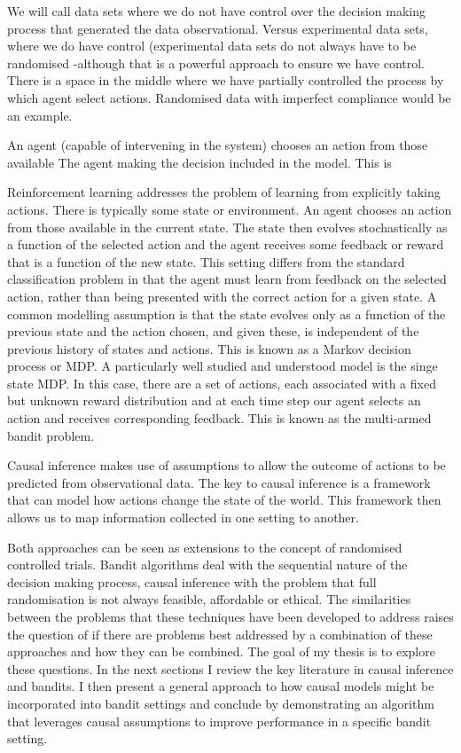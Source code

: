 \documentclass[11pt,a4paper,oneside]{book}
\theoremstyle{plain}
\theoremstyle{definition}
\begin{document}
We will call data sets where we do not have control over the decision making process that generated the data observational. Versus experimental data sets, where we do have control (experimental data sets do not always have to be randomised -although that is a powerful approach to ensure we have control. There is a space in the middle where we have partially controlled the process by which agent select actions. Randomised data with imperfect compliance would be an example.


An agent (capable of intervening in the system) chooses an action from those available The agent making the decision included in the model. This is

Reinforcement learning addresses the problem of learning from explicitly taking actions. There
is typically some state or environment. An agent chooses an action from those available in the
current state. The state then evolves stochastically as a function of the selected action and
the agent receives some feedback or reward that is a function of the new state. This setting
differs from the standard classification problem in that the agent must learn from feedback on
the selected action, rather than being presented with the correct action for a given state. A
common modelling assumption is that the state evolves only as a function of the previous state
and the action chosen, and given these, is independent of the previous history of states and
actions. This is known as a Markov decision process or MDP. A particularly well studied and
understood model is the singe state MDP. In this case, there are a set of actions, each associated
with a fixed but unknown reward distribution and at each time step our agent selects an action
and receives corresponding feedback. This is known as the multi-armed bandit problem.

Causal inference makes use of assumptions to allow the outcome of actions to be predicted from
observational data. The key to causal inference is a framework that can model how actions
change the state of the world. This framework then allows us to map information collected in
one setting to another.

Both approaches can be seen as extensions to the concept of randomised controlled trials. Bandit
algorithms deal with the sequential nature of the decision making process, causal inference with
the problem that full randomisation is not always feasible, affordable or ethical. The similarities
between the problems that these techniques have been developed to address raises the question
of if there are problems best addressed by a combination of these approaches and how they
can be combined. The goal of my thesis is to explore these questions. In the next sections I
review the key literature in causal inference and bandits. I then present a general approach to
how causal models might be incorporated into bandit settings and conclude by demonstrating
an algorithm that leverages causal assumptions to improve performance in a specific bandit
setting.
\end{document}
